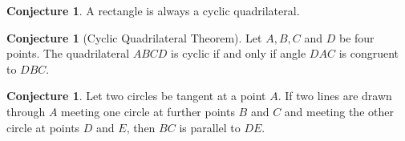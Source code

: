 \documentclass{tufte-handout}
\theoremstyle{definition}
\newtheorem{conjecture}[problem]{Conjecture}
\begin{document}
\begin{conjecture}\label{conj:rect-cyclic}
A rectangle is always a cyclic quadrilateral.
\end{conjecture}

\begin{conjecture}[Cyclic Quadrilateral Theorem]\label{conj:angles-cyclic-quad}
Let $A,B,C$ and $D$ be four points. The quadrilateral $ABCD$ is cyclic if and only if angle $DAC$ is congruent to $DBC$.
\end{conjecture}


\begin{conjecture}\label{conj:tangent-to-two-circles}
Let two circles be tangent at a point $A$. If two lines are drawn through $A$ meeting one circle at further points $B$ and $C$ and meeting the other circle at points $D$ and $E$, then $BC$ is parallel to $DE$.
\end{conjecture}


\vfill
\end{document}
